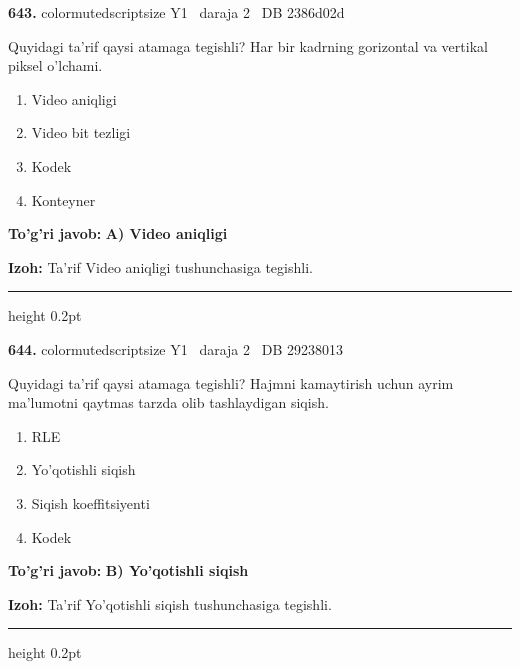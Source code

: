 \documentclass[10pt,a4paper,oneside]{article}
\begin{document}
\noindent\textbf{\color{ink}643.}  {color{muted}scriptsize Y1 \textbullet\ daraja 2 \textbullet\ DB 2386d02d}
\par
Quyidagi ta'rif qaysi atamaga tegishli? Har bir kadrning gorizontal va vertikal piksel o'lchami.
\begin{enumerate}[label=\Alph*),leftmargin=9mm]
\item Video aniqligi
\item Video bit tezligi
\item Kodek
\item Konteyner
\end{enumerate}
\begin{tcolorbox}[enhanced,breakable,colback=teal!4,colframe=teal!50!black,boxrule=0.5pt,arc=1.1mm,left=3mm,right=3mm,top=1.7mm,bottom=1.7mm,before skip=2mm,after skip=2mm]
\textbf{\color{teal}To'g'ri javob:} \textbf{A) Video aniqligi}
\par\smallskip
\textbf{Izoh:} Ta'rif Video aniqligi tushunchasiga tegishli.
\end{tcolorbox}
\vspace{2mm}\hrule height 0.2pt \vspace{3mm}

\noindent\textbf{\color{ink}644.}  {color{muted}scriptsize Y1 \textbullet\ daraja 2 \textbullet\ DB 29238013}
\par
Quyidagi ta'rif qaysi atamaga tegishli? Hajmni kamaytirish uchun ayrim ma'lumotni qaytmas tarzda olib tashlaydigan siqish.
\begin{enumerate}[label=\Alph*),leftmargin=9mm]
\item RLE
\item Yo'qotishli siqish
\item Siqish koeffitsiyenti
\item Kodek
\end{enumerate}
\begin{tcolorbox}[enhanced,breakable,colback=teal!4,colframe=teal!50!black,boxrule=0.5pt,arc=1.1mm,left=3mm,right=3mm,top=1.7mm,bottom=1.7mm,before skip=2mm,after skip=2mm]
\textbf{\color{teal}To'g'ri javob:} \textbf{B) Yo'qotishli siqish}
\par\smallskip
\textbf{Izoh:} Ta'rif Yo'qotishli siqish tushunchasiga tegishli.
\end{tcolorbox}
\vspace{2mm}\hrule height 0.2pt \vspace{3mm}
\end{document}
